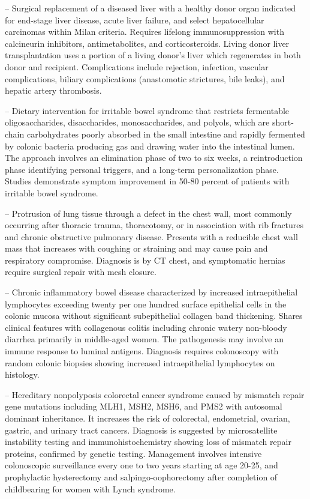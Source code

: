 -- Surgical replacement of a diseased liver with a healthy donor organ indicated for end-stage liver disease, acute liver failure, and select hepatocellular carcinomas within Milan criteria. Requires lifelong immunosuppression with calcineurin inhibitors, antimetabolites, and corticosteroids. Living donor liver transplantation uses a portion of a living donor's liver which regenerates in both donor and recipient. Complications include rejection, infection, vascular complications, biliary complications (anastomotic strictures, bile leaks), and hepatic artery thrombosis.

-- Dietary intervention for irritable bowel syndrome that restricts fermentable oligosaccharides, disaccharides, monosaccharides, and polyols, which are short-chain carbohydrates poorly absorbed in the small intestine and rapidly fermented by colonic bacteria producing gas and drawing water into the intestinal lumen. The approach involves an elimination phase of two to six weeks, a reintroduction phase identifying personal triggers, and a long-term personalization phase. Studies demonstrate symptom improvement in 50-80 percent of patients with irritable bowel syndrome.

-- Protrusion of lung tissue through a defect in the chest wall, most commonly occurring after thoracic trauma, thoracotomy, or in association with rib fractures and chronic obstructive pulmonary disease. Presents with a reducible chest wall mass that increases with coughing or straining and may cause pain and respiratory compromise. Diagnosis is by CT chest, and symptomatic hernias require surgical repair with mesh closure.

-- Chronic inflammatory bowel disease characterized by increased intraepithelial lymphocytes exceeding twenty per one hundred surface epithelial cells in the colonic mucosa without significant subepithelial collagen band thickening. Shares clinical features with collagenous colitis including chronic watery non-bloody diarrhea primarily in middle-aged women. The pathogenesis may involve an immune response to luminal antigens. Diagnosis requires colonoscopy with random colonic biopsies showing increased intraepithelial lymphocytes on histology.

-- Hereditary nonpolyposis colorectal cancer syndrome caused by mismatch repair gene mutations including MLH1, MSH2, MSH6, and PMS2 with autosomal dominant inheritance. It increases the risk of colorectal, endometrial, ovarian, gastric, and urinary tract cancers. Diagnosis is suggested by microsatellite instability testing and immunohistochemistry showing loss of mismatch repair proteins, confirmed by genetic testing. Management involves intensive colonoscopic surveillance every one to two years starting at age 20-25, and prophylactic hysterectomy and salpingo-oophorectomy after completion of childbearing for women with Lynch syndrome.

